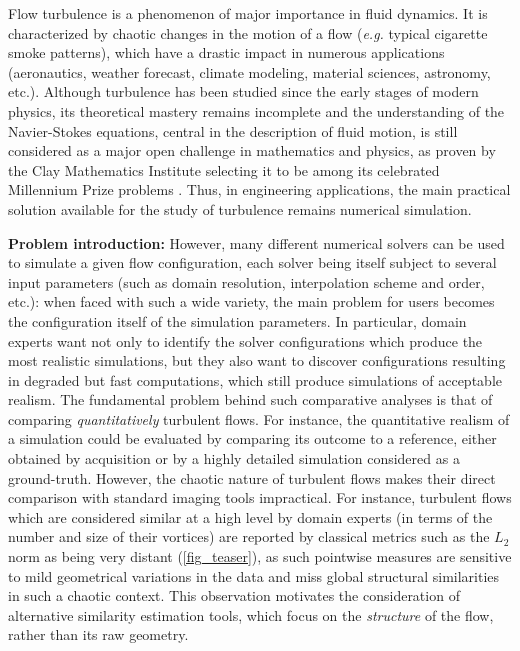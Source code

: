 Flow turbulence is a phenomenon of major importance in fluid dynamics.
It is characterized by chaotic changes in the motion of a flow (\emph{e.g.}
typical cigarette smoke patterns), which have a drastic impact in numerous
applications (aeronautics, weather forecast, climate modeling, material
sciences, astronomy, etc.).
Although turbulence has been studied since the early stages of modern physics,
its theoretical mastery remains incomplete \cite{baez2006} and the
understanding of the
Navier-Stokes equations, central
in the description of
fluid motion, is still
considered as
a
major open challenge in mathematics and physics,
as proven by the Clay Mathematics Institute selecting it to be
among its celebrated Millennium Prize problems \cite{fefferman2000}.
Thus, in engineering applications, the main practical solution available for
the study of turbulence
remains numerical simulation.

\noindent
\textbf{Problem introduction:}
However,
many
different numerical solvers can be used to simulate a given flow configuration, each
solver being itself subject to several input parameters (such as domain
resolution, interpolation scheme and order, etc.): when faced with such a wide variety,
the main problem for users becomes
the configuration itself of the simulation parameters.
In particular, domain experts want not only to identify
the solver configurations which produce the most realistic simulations, but
they also want to discover configurations resulting in
degraded but fast
computations, which still produce simulations of acceptable realism. The
fundamental problem behind such comparative analyses is that of comparing
\emph{quantitatively} turbulent flows. For instance, the quantitative realism
of a simulation could be evaluated by comparing its outcome to a reference,
either obtained by acquisition or by a highly detailed simulation considered as
a ground-truth. However, the chaotic nature of turbulent flows makes their direct
comparison with standard imaging tools
impractical. For instance, turbulent flows which are considered similar at a
high level by domain experts (in terms of the number and size of their vortices)
are reported by classical metrics such as the $L_2$ norm as being very distant
(\autoref{fig_teaser}), as such pointwise measures are sensitive to mild
geometrical variations in the data and miss global structural
similarities in such a chaotic context. This observation motivates the
consideration of alternative similarity estimation tools, which focus on the
\emph{structure} of the flow, rather than its raw geometry.

